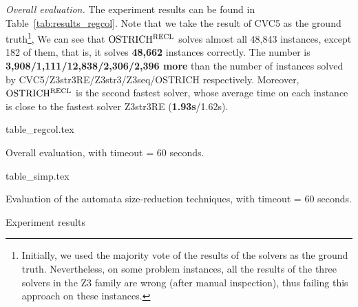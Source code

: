 \medskip
\noindent
\emph{Overall evaluation.} 
The experiment results can be found in Table~\ref{tab:results_regcol}. Note that we take the result of CVC5 as the ground truth\footnote{Initially,  we used the majority vote of the results of the solvers as the ground truth. Nevertheless, on some problem instances, all the results of the three solvers in the Z3 family are wrong (after manual inspection), thus failing this approach on these instances.},  We can see that $\rm OSTRICH^{RECL}$ solves almost all 48,843 instances, except 182 of them, that is, it solves \textbf{48,662} instances correctly. The number is %
\textbf{3,908/1,111/12,838/2,306/2,396 more} than the number of instances solved by CVC5/Z3str3RE/Z3str3/Z3seq/OSTRICH respectively.
%      
%
Moreover, $\rm OSTRICH^{RECL}$ is the second fastest solver, whose average time on each instance is close to the fastest solver Z3str3RE (\textbf{1.93s}/1.62s).

%
\begin{table}
  \vspace{-4mm}
  \centering
  \begin{subtable}{0.513\textwidth}
      \centering
      {table_regcol.tex}
      \caption{Overall evaluation, with timeout = 60 seconds.}
      \label{tab:results_regcol}
  \end{subtable}
  \begin{subtable}{0.477\textwidth}
      \centering
      {table_simp.tex}
      \caption{Evaluation of the automata size-reduction techniques, with timeout = 60 seconds.}
      \label{tab:results_simp}
  \end{subtable}
  \vspace{-2mm}
  \caption{Experiment results}
  \vspace{-8mm}
\end{table}


